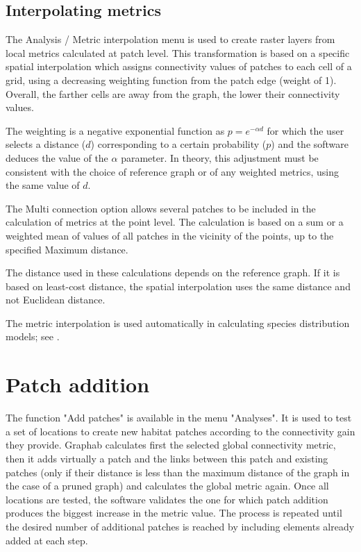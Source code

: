 \documentclass{article}
\begin{document}
\subsection{Interpolating metrics}

The Analysis / Metric interpolation menu is used to create raster layers from local metrics calculated at patch level. This transformation is based on a specific spatial interpolation which assigns connectivity values of patches to each cell of a grid, using a decreasing weighting function from the patch edge (weight of 1). Overall, the farther cells are away from the graph, the lower their connectivity values. 

The weighting is a negative exponential function as $p={e}^{-\mathit{\alpha d}}$ for which the user selects a distance ($d$) corresponding to a certain probability ($p$) and the software deduces the value of the $\alpha$ parameter. In theory, this adjustment must be consistent with the choice of reference graph or of any weighted metrics, using the same value of $d$. 

The Multi connection option allows several patches to be included in the calculation of metrics at the point level. The calculation is based on a sum or a weighted mean of values of all patches in the vicinity of the points, up to the specified Maximum distance. 

The distance used in these calculations depends on the reference graph. If it is based on least-cost distance, the spatial interpolation uses the same distance and not Euclidean distance.

The metric interpolation is used automatically in calculating species distribution models; see .


\section{Patch addition}

The function "Add patches" is available in the menu "Analyses". It is used to test a set of locations to create new habitat patches according to the connectivity gain they provide. Graphab calculates first the selected global connectivity metric, then it adds virtually a patch and the links between this patch and existing patches (only if their distance is less than the maximum distance of the graph in the case of a pruned graph) and calculates the global metric again. Once all locations are tested, the software validates the one for which patch addition produces the biggest increase in the metric value. The process is repeated until the desired number of additional patches is reached by including elements already added at each step.
\end{document}
